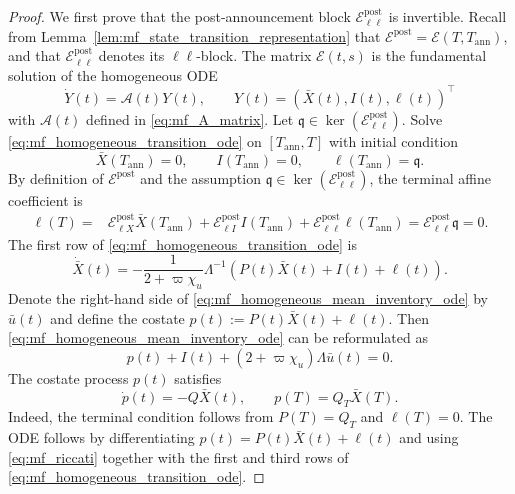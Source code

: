\documentclass[10pt,a4paper]{amsart}
\begin{document}
\begin{proof}
We first prove that the post-announcement block
\(\mathcal E^{\mathrm{post}}_{\ell\ell}\) is invertible. Recall from
Lemma~\ref{lem:mf_state_transition_representation} that
\(\mathcal E^{\mathrm{post}}=\mathcal E(T,T_{\mathrm{ann}})\), and that
\(\mathcal E^{\mathrm{post}}_{\ell\ell}\) denotes its \(\ell\ell\)-block. The matrix
\(\mathcal E(t,s)\) is the fundamental solution of the homogeneous ODE
\begin{equation}\label{eq:mf_homogeneous_transition_ode}
\dot{Y}(t)=\mathcal A(t)Y(t),
\qquad
Y(t)=(\bar X(t),I(t),\ell(t))^\top
\end{equation}
with \(\mathcal{A}(t)\) defined in \eqref{eq:mf_A_matrix}.
Let \(\mathfrak q\in\ker(\mathcal E^{\mathrm{post}}_{\ell\ell})\). Solve
\eqref{eq:mf_homogeneous_transition_ode} on
\([T_{\mathrm{ann}},T]\) with initial condition
\[
\bar X(T_{\mathrm{ann}})=0,
\qquad
I(T_{\mathrm{ann}})=0,
\qquad
\ell(T_{\mathrm{ann}})=\mathfrak q.
\]
By definition of \(\mathcal E^{\mathrm{post}}\) and the assumption
\(\mathfrak q\in\ker(\mathcal E^{\mathrm{post}}_{\ell\ell})\), the terminal affine coefficient is
\[
\begin{aligned}
\ell(T)
={}&
\mathcal E^{\mathrm{post}}_{\ell X}\bar X(T_{\mathrm{ann}})
+
\mathcal E^{\mathrm{post}}_{\ell I}I(T_{\mathrm{ann}})
+
\mathcal E^{\mathrm{post}}_{\ell\ell}\ell(T_{\mathrm{ann}})
=\mathcal E^{\mathrm{post}}_{\ell\ell}\mathfrak q
=0.
\end{aligned}
\]
The first row of \eqref{eq:mf_homogeneous_transition_ode} is
\begin{equation}\label{eq:mf_homogeneous_mean_inventory_ode}
\dot{\bar X}(t)
=
-\frac{1}{2+\varpi\chi_u}\Lambda^{-1}
\left(P(t)\bar X(t)+I(t)+\ell(t)\right).
\end{equation}
Denote the right-hand side of
\eqref{eq:mf_homogeneous_mean_inventory_ode} by \(\bar u(t)\) and define the
costate \(p(t):=P(t)\bar X(t)+\ell(t)\). Then
\eqref{eq:mf_homogeneous_mean_inventory_ode} can be reformulated as
\begin{equation}\label{eq:mf_homogeneous_first_row_identity}
p(t)+I(t)+(2+\varpi\chi_u)\Lambda\bar u(t)=0.
\end{equation}
The costate process \(p(t)\) satisfies
\[
\dot p(t)=- Q\bar X(t),
\qquad
p(T)=Q_T\bar X(T).
\]
Indeed, the terminal condition follows from \(P(T)=Q_T\) and \(\ell(T)=0\). The ODE
follows by differentiating \(p(t)=P(t)\bar X(t)+\ell(t)\) and using
\eqref{eq:mf_riccati} together with the first and third rows of
\eqref{eq:mf_homogeneous_transition_ode}.

\end{proof}
\end{document}
